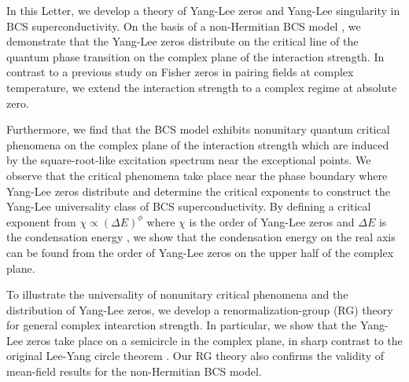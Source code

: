 \documentclass[aps,prl,twocolumn,nofootinbib,superscriptaddress,longbibliography]{revtex4-1}
\begin{document}
	In this Letter, we develop a theory of Yang-Lee zeros and Yang-Lee singularity
	in BCS superconductivity. On the basis of a non-Hermitian BCS model \cite{Yamamoto2019}, we demonstrate
	that the Yang-Lee zeros distribute on the critical line of the quantum phase transition on the complex plane of the interaction strength. %
	In contrast to a previous study \cite{Sumaryada:2007uu} on Fisher zeros in pairing fields at complex temperature, we extend the interaction strength to a complex regime at absolute zero.
	
	Furthermore, we find that the BCS model exhibits nonunitary quantum critical phenomena on the complex plane of the interaction strength which are induced by the square-root-like excitation spectrum near the exceptional points. We observe that the critical phenomena take place near the phase boundary where Yang-Lee zeros distribute and determine the critical exponents to construct the Yang-Lee universality class of BCS superconductivity. By defining a critical exponent from $\chi\propto(\Delta E)^{\phi}$ where $\chi$ is the order of Yang-Lee zeros and $\Delta E$ is the condensation energy \cite{Coleman:2015vz}, we show that the condensation energy on the real axis can be found from the order of Yang-Lee zeros on the upper half of the complex plane. 
	 
	To illustrate the universality of nonunitary critical phenomena and the distribution of Yang-Lee zeros, we develop a %
	renormalization-group (RG) theory for general complex intearction strength.  %
	In particular, we show that the Yang-Lee zeros  take place on a semicircle in the complex plane, in sharp contrast to the original Lee-Yang circle theorem \cite{PhysRev.87.404,PhysRev.87.410}. Our RG theory also %
	confirms the validity of mean-field results for the non-Hermitian BCS model. %
\end{document}
